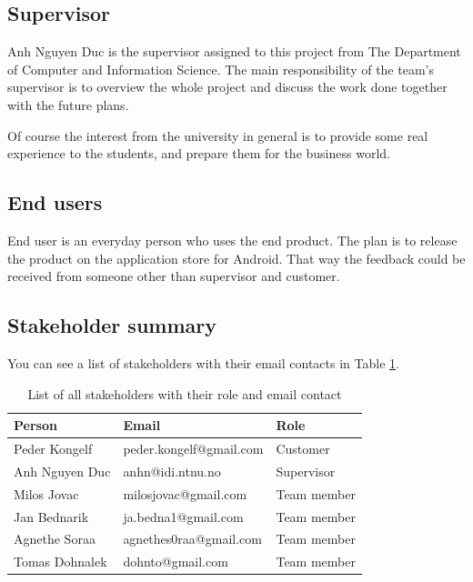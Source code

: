 \subsection{Supervisor}

Anh Nguyen Duc is the supervisor assigned to this project from The Department of Computer and Information Science. 
The main responsibility of the team's supervisor is to overview the whole project and discuss the work done together with the future plans. 

Of course the interest from the university in general is to provide some real experience to the students, and prepare them for the business world.

\subsection{End users}
End user is an everyday person who uses the end product. The plan is to release the product on the application store for Android. That way the feedback could be received from someone other than supervisor and customer. 

\subsection{Stakeholder summary}
You can see a list of stakeholders with their email contacts in Table \ref{tab:stakeholders_summary}.

\begin{table}[!ht]\centering
\caption{List of all stakeholders with their role and email contact}
\label{tab:stakeholders_summary}
\def\arraystretch{1.3}
\begin{tabular}{lll}
\toprule[0.5mm]
\textbf{Person} & \textbf{Email} & \textbf{Role}\\
\midrule
Peder Kongelf & peder.kongelf@gmail.com  & Customer\\
\midrule
Anh Nguyen Duc	 & anhn@idi.ntnu.no & Supervisor \\
\midrule
Milos Jovac &  milosjovac@gmail.com & Team member  \\
Jan Bednarik &  ja.bedna1@gmail.com & Team member\\
Agnethe Soraa & agnethes0raa@gmail.com & Team member  \\
Tomas Dohnalek & dohnto@gmail.com & Team member \\
\bottomrule[0.5mm]
\end{tabular}
\end{table}

